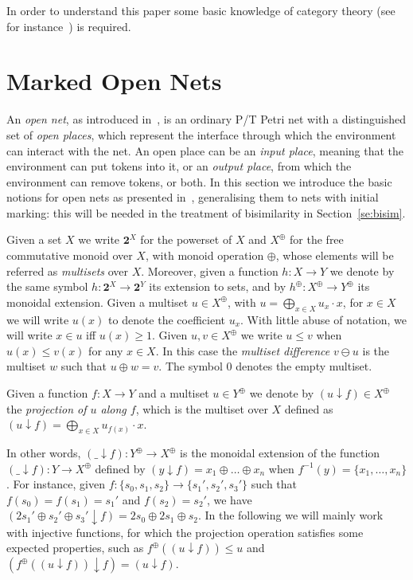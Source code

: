 \documentclass{LMCS}
\newcommand{\mon}[1]{\ensuremath{{#1}^\oplus}}
\newcommand{\res}[2]{\ensuremath{({#1}\!\downarrow\!{#2})}}
\begin{document}
In order to understand this paper some basic knowledge of category theory
(see for instance~\cite{p:basic-category-theory}) is required.



\section{Marked Open Nets}
\label{se:open-nets}

An \emph{open net}, as introduced in~\cite{BCEH:CMRS,BCEH:CSOP}, is an
ordinary P/T Petri net with a distinguished set of 
\emph{open places}, which represent the interface through which the
environment can interact with the net. 
An open place can be an \emph{input place}, meaning that the
environment can put tokens into it, or an \emph{output place}, 
from which the environment can remove tokens, or both. 
In this section we introduce the basic notions for open nets as
presented in~\cite{BCEH:CSOP}, generalising them to nets with initial
marking:  this will be needed in the treatment of bisimilarity in
Section~\ref{se:bisim}.  

Given a set $X$ we write $\mathbf{2}^{X}$ for the powerset of $X$ and
$\mon{X}$ for the free commutative monoid over $X$, with monoid
operation $\oplus$, whose elements will be referred as
\emph{multisets} over $X$.  Moreover, given a function $h : X \to Y$
we denote by the same symbol $h : \mathbf{2}^{X} \to \mathbf{2}^{Y}$
its extension to sets, and by $\mon{h} : \mon{X} \to \mon{Y}$ its
monoidal extension.
Given a multiset $u \in \mon{X}$, with $u = \bigoplus_{x \in X} u_x
\cdot x$, for $x \in X$ we will write $u(x)$ to denote the coefficient
$u_x$. With little abuse of notation, we will write $x \in u$
iff $u(x) \geq 1$. Given $u, v \in \mon{X}$ we write $u \leq v$ when $u(x) \leq
v(x)$ for any $x \in X$. In this case the \emph{multiset difference}
$v \ominus u$ is the multiset $w$ such that $u \oplus w= v$. 
The symbol $0$ denotes the empty multiset.



\begin{defi}
  \label{de:multiset-proj}
  Given a function $f : X \to Y$ and a multiset $u \in \mon{Y}$ we
  denote by $\res{u}{f} \in \mon{X}$ the \emph{projection of $u$ along
    $f$}, which is the multiset over $X$ defined as $\res{u}{f} =
  \bigoplus_{x \in X} u_{f(x)} \cdot x$.
\end{defi}
In other words, $\res{\_}{f} : \mon{Y} \to \mon{X}$ is the monoidal
extension of the function $\res{\_}{f} : Y \to \mon{X}$ defined by
$\res{y}{f} = x_1 \oplus \ldots \oplus x_n$ when $f^{-1}(y) = \{ x_1,
\ldots, x_n \}$.
For instance, given $f : \{ s_0, s_1, s_2 \} \to \{ s_1', s_2', s_3'\}$
such that $f(s_0)= f(s_1) = s_1'$ and $f(s_2) = s_2'$, we have $\res{2 s_1'
  \oplus s_2' \oplus s_3'}{f} = 2 s_0 \oplus 2 s_1 \oplus s_2$.
In the following we
will mainly work with injective
functions, for which the projection operation satisfies some expected
properties, such as $\mon{f}(\res{u}{f}) \le u$ and
$\res{\mon{f}(\res{u}{f})}{f} = \res{u}{f}$.
\end{document}
